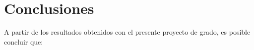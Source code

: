 \documentclass[a4paper,12pt,twoside]{proyectotanquesecci}
\begin{document}
























\chapter{Conclusiones}

A partir de los resultados obtenidos con el presente proyecto de grado, es posible concluir que: \\
\end{document}
